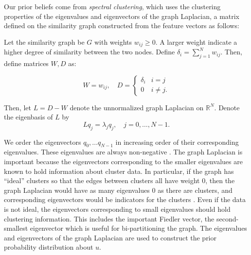 \documentclass{siamart1116}
\begin{document}
Our prior beliefs come from \textit{spectral clustering}, which uses the clustering properties of the eigenvalues and eigenvectors of the graph Laplacian, a matrix defined on the similarity graph constructed from the feature vectors as follows:

Let the similarity graph be $G$ with weights $w_{ij} \ge 0$. A larger weight indicate a higher degree of similarity between the two nodes. Define $\delta_i = \sum_{j=1}^N w_{ij}$. Then, define matrices $W, D$ as:

\[W = w_{ij},\quad D = \begin{cases} 
\delta_i    & i = j \\
0           & i \neq j. 
\end{cases}\]

Then, let $L = D - W$ denote the unnormalized graph Laplacian on $\mathbb{R}^N$. Denote the eigenbasis of $L$ by
\begin{equation}
\label{eqn:laplacian}
Lq_j = \lambda_j q_j,\quad j=0,\ldots,N-1.
\end{equation}

We order the eigenvectors $q_0, \ldots q_{N-1}$ in increasing order of their corresponding eigenvalues. These eigenvalues are always non-negative \cite{Spectral}. The graph Laplacian is important because the eigenvectors corresponding to the smaller eigenvalues are known to hold information about cluster data. In particular, if the graph has ``ideal'' clusters so that the edges between clusters all have weight 0, then the graph Laplacian would have as many eigenvalues 0 as there are clusters, and corresponding eigenvectors would be indicators for the clusters \cite{Spectral}. Even if the data is not ideal, the eigenvectors corresponding to small eigenvalues should hold clustering information. This includes the important Fiedler vector, the second-smallest eigenvector which is useful for bi-partitioning the graph. The eigenvalues and eigenvectors of the graph Laplacian are used to construct the prior probability distribution about $u$.

\end{document}
